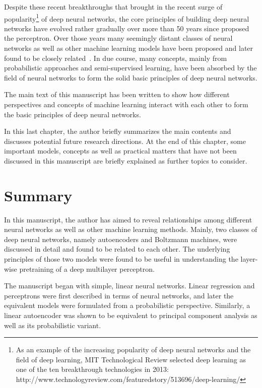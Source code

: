 \documentclass{now}
\begin{document}
Despite these recent breakthroughs that brought in the recent surge of
popularity\footnote{
    As an example of the increasing popularity of deep neural networks and
    the field of deep learning, MIT Technological Review selected deep
    learning as one of the ten breakthrough technologies in 2013:
    \\http://www.technologyreview.com/featuredstory/513696/deep-learning/
} of deep neural networks, the core principles of building deep neural
networks have evolved rather gradually over more than 50 years since
\citet{Rosenblatt1958} proposed the perceptron. Over those years many
seemingly distant classes of neural networks as well as other machine
learning models have been proposed and later found to be closely
related~\citep[see, e.g.,][]{Haykin2009}. In due course, many concepts,
mainly from probabilistic approaches and semi-supervised learning, have
been absorbed by the field of neural networks to form the solid basic
principles of deep neural networks.

The main text of this manuscript has been written to show how different
perspectives and concepts of machine learning interact with each other to
form the basic principles of deep neural networks. 

In this last chapter, the author briefly summarizes the main contents and
discusses potential future research directions. At the end of this chapter, some
important models, concepts as well as practical matters that have not been
discussed in this manuscript are briefly explained as further topics to
consider.

\section{Summary}

In this manuscript, the author has aimed to reveal relationships among different
neural networks as well as other machine learning methods. Mainly, two classes
of deep neural networks, namely autoencoders and Boltzmann machines, were
discussed in detail and found to be related to each other.  The underlying
principles of those two models were found to be useful in understanding the
layer-wise pretraining of a deep multilayer perceptron.

The manuscript began with simple, linear neural networks.  Linear regression and
perceptrons were first described in terms of neural networks, and later the
equivalent models were formulated from a probabilistic perspective. Similarly, a
linear autoencoder was shown to be equivalent to principal component analysis as
well as its probabilistic variant.
\end{document}

